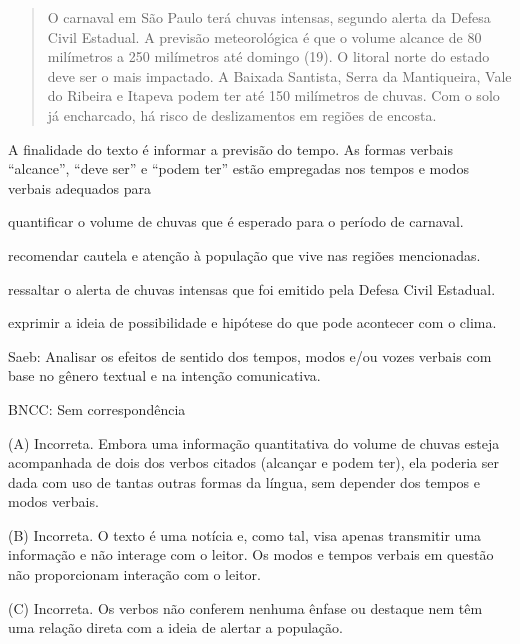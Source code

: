 \begin{quote}
O carnaval em São Paulo terá chuvas intensas, segundo alerta da Defesa
Civil Estadual. A previsão meteorológica é que o volume alcance de 80
milímetros a 250 milímetros até domingo (19). O litoral norte do estado
deve ser o mais impactado. A Baixada Santista, Serra da Mantiqueira,
Vale do Ribeira e Itapeva podem ter até 150 milímetros de chuvas. Com o
solo já encharcado, há risco de deslizamentos em regiões de encosta.
\end{quote}


A finalidade do texto é informar a previsão do tempo. As formas verbais
``alcance'', ``deve ser'' e ``podem ter'' estão empregadas nos tempos e
modos verbais adequados para

\begin{escolha}
\item quantificar o volume de chuvas que é esperado para o período de
carnaval.

\item recomendar cautela e atenção à população que vive nas regiões
mencionadas.

\item ressaltar o alerta de chuvas intensas que foi emitido pela Defesa
Civil Estadual.

\item exprimir a ideia de possibilidade e hipótese do que pode acontecer
com o clima.
\end{escolha}
Saeb: Analisar os efeitos de sentido dos tempos, modos e/ou vozes
verbais com base no gênero textual e na intenção comunicativa.

BNCC: Sem correspondência

(A) Incorreta. Embora uma informação quantitativa do volume de chuvas
esteja acompanhada de dois dos verbos citados (alcançar e podem ter),
ela poderia ser dada com uso de tantas outras formas da língua, sem
depender dos tempos e modos verbais.

(B) Incorreta. O texto é uma notícia e, como tal, visa apenas transmitir
uma informação e não interage com o leitor. Os modos e tempos verbais em
questão não proporcionam interação com o leitor.

(C) Incorreta. Os verbos não conferem nenhuma ênfase ou destaque nem têm
uma relação direta com a ideia de alertar a população.

